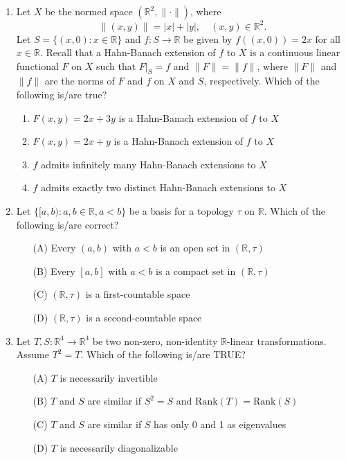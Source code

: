 \documentclass[journal]{IEEEtran}
\numberwithin{equation}{enumi}
\numberwithin{figure}{enumi}
\begin{document}
\begin{enumerate}
    \item Let $X$ be the normed space $(\mathbb{R}^2, \|\cdot\|)$, where
    \[
    \|(x, y)\| = |x| + |y|, \quad (x, y) \in \mathbb{R}^2.
    \]
    Let $S = \{(x, 0) : x \in \mathbb{R}\}$ and $f : S \rightarrow \mathbb{R}$ be given by $f((x, 0)) = 2x$ for all $x \in \mathbb{R}$. Recall that a Hahn-Banach extension of $f$ to $X$ is a continuous linear functional $F$ on $X$ such that $F|_S = f$ and $\|F\| = \|f\|$, where $\|F\|$ and $\|f\|$ are the norms of $F$ and $f$ on $X$ and $S$, respectively. Which of the following is/are true?
    \begin{enumerate}
        \item $F(x, y) = 2x + 3y$ is a Hahn-Banach extension of $f$ to $X$
        \item $F(x, y) = 2x + y$ is a Hahn-Banach extension of $f$ to $X$
        \item $f$ admits infinitely many Hahn-Banach extensions to $X$
        \item $f$ admits exactly two distinct Hahn-Banach extensions to $X$
    \end{enumerate}

    \bigskip

    \item Let $\{[a, b) : a, b \in \mathbb{R}, a < b\}$ be a basis for a topology $\tau$ on $\mathbb{R}$. Which of the following is/are correct?
    \begin{enumerate}
        \item[(A)] Every $(a, b)$ with $a < b$ is an open set in $(\mathbb{R}, \tau)$
        \item[(B)] Every $[a, b]$ with $a < b$ is a compact set in $(\mathbb{R}, \tau)$
        \item[(C)] $(\mathbb{R}, \tau)$ is a first-countable space
        \item[(D)] $(\mathbb{R}, \tau)$ is a second-countable space
    \end{enumerate}
    \bigskip
    \item Let $T, S : \mathbb{R}^4 \rightarrow \mathbb{R}^4$ be two non-zero, non-identity $\mathbb{R}$-linear transformations. Assume $T^2 = T$. Which of the following is/are TRUE?
    \begin{enumerate}
        \item[(A)] $T$ is necessarily invertible
        \item[(B)] $T$ and $S$ are similar if $S^2 = S$ and $\text{Rank}(T) = \text{Rank}(S)$
        \item[(C)] $T$ and $S$ are similar if $S$ has only 0 and 1 as eigenvalues
        \item[(D)] $T$ is necessarily diagonalizable
    \end{enumerate}


\end{enumerate}
\end{document}
